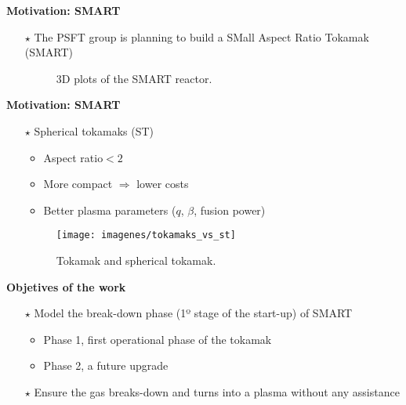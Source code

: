 \documentclass[10pt]{beamer}
\begin{document}

\begin{frame}{\bf Motivation: SMART}
	\begin{itemize}
		\item[$\star$] The PSFT group is planning to build a SMall Aspect Ratio Tokamak (SMART)

		\begin{figure}[htbp]
		\centering
		\hfill
		\caption{3D plots of the SMART reactor.}
		\end{figure}
	\end{itemize}
\end{frame}


\begin{frame}{\bf Motivation: SMART}
	\begin{itemize}
		\item[$\star$] Spherical tokamaks  (ST)
		\begin{itemize}
			\item Aspect ratio$<2$
			\item More compact $\Rightarrow$ lower costs
			\item Better plasma parameters ($q$, $\beta$, fusion power)
		\end{itemize}

	\begin{figure}[htbp]
	\texttt{[image: imagenes/tokamaks\_vs\_st]}
	\caption{Tokamak and spherical tokamak.}
	\end{figure}

	\end{itemize}
\end{frame}


\begin{frame}{\bf Objetives of the work}
	\begin{itemize}
		\item[$\star$] Model the break-down phase (1º stage of the start-up) of SMART 
		\begin{itemize}
			\item Phase 1, first operational phase of the tokamak
			\item Phase 2, a future upgrade
		\end{itemize}
		\item[$\star$] Ensure the gas breaks-down and turns into a plasma without any assistance

	\end{itemize}
\end{frame}
\end{document}
